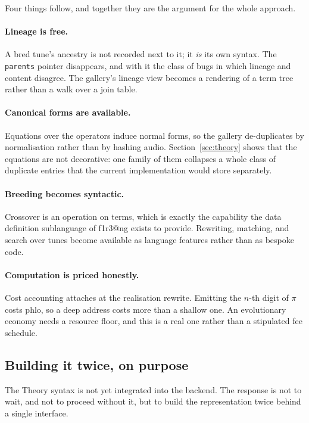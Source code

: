 \documentclass[11pt,a4paper]{article}
\theoremstyle{definition}
\theoremstyle{plain}
\begin{document}
Four things follow, and together they are the argument for the whole approach.

\paragraph{Lineage is free.} A bred tune's ancestry is not recorded next to it; it \emph{is} its
own syntax. The \texttt{parents} pointer disappears, and with it the class of bugs in which
lineage and content disagree. The gallery's lineage view becomes a rendering of a term tree rather
than a walk over a join table.

\paragraph{Canonical forms are available.} Equations over the operators induce normal forms, so the
gallery de-duplicates by normalisation rather than by hashing audio. Section~\ref{sec:theory} shows
that the equations are not decorative: one family of them collapses a whole class of duplicate
entries that the current implementation would store separately.

\paragraph{Breeding becomes syntactic.} Crossover is an operation on terms, which is exactly the
capability the data definition sublanguage of f1r3\textbar{}@ng exists to provide. Rewriting,
matching, and search over tunes become available as language features rather than as bespoke code.

\paragraph{Computation is priced honestly.} Cost accounting attaches at the realisation rewrite.
Emitting the $n$-th digit of $\pi$ costs phlo, so a deep address costs more than a shallow one.
An evolutionary economy needs a resource floor, and this is a real one rather than a stipulated
fee schedule.

\subsection{Building it twice, on purpose}

The Theory syntax is not yet integrated into the backend. The response is not to wait, and not to
proceed without it, but to build the representation twice behind a single interface.
\end{document}
